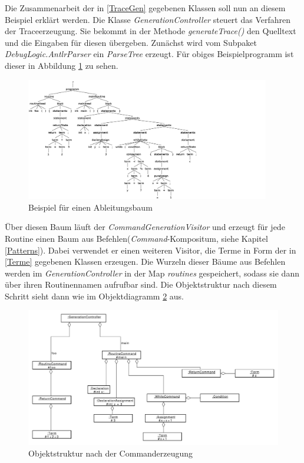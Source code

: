 \documentclass[parskip=full]{scrartcl}
\begin{document}
Die Zusammenarbeit der in \ref{TraceGen} gegebenen Klassen soll nun an diesem Beispiel erklärt werden. 
Die Klasse \textit{GenerationController} steuert das Verfahren der Traceerzeugung. Sie bekommt in der Methode \textit{generateTrace()} den Quelltext und die Eingaben für diesen übergeben. Zunächst wird vom Subpaket \textit{DebugLogic.AntlrParser} ein \textit{ParseTree} erzeugt. Für obiges Beispielprogramm ist dieser in Abbildung \ref{ParseTreeExample} zu sehen.
\begin{figure}[!h]
\centering
\includegraphics[width=0.95\textwidth]{diagrammIdeenUmlet/parseTreeExample.png}
\caption{Beispiel für einen Ableitungsbaum}
\label{ParseTreeExample}
\end{figure}
Über diesen Baum läuft der \textit{CommandGenerationVisitor} und erzeugt für jede Routine einen Baum aus Befehlen(\textit{Command}-Kompositum, siehe Kapitel \ref{Patterns}). Dabei verwendet er einen weiteren Visitor, die Terme in Form der in \ref{Terme} gegebenen Klassen erzeugen. 
Die Wurzeln dieser Bäume aus Befehlen werden im \textit{GenerationController} in der Map \textit{routines} gespeichert, sodass sie dann über ihren Routinennamen aufrufbar sind. Die Objektstruktur nach diesem Schritt sieht dann wie im Objektdiagramm \ref{CommandTreeExample} aus.
\begin{figure}[!h]
\includegraphics[width=1.2\textwidth]{diagrammIdeenUmlet/CommandTreeExample.pdf}
\caption{Objektstruktur nach der Commanderzeugung}
\label{CommandTreeExample}
\end{figure}
\end{document}
